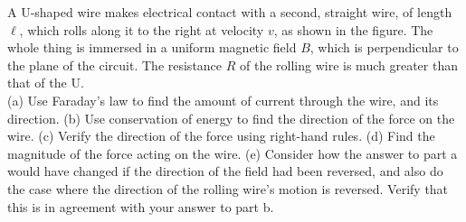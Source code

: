 A U-shaped wire makes electrical contact with a second, straight wire, of length $\ell$, which rolls along it to the
right at velocity $v$,
as shown in the figure. The whole thing is immersed in a uniform magnetic field $B$, which is
perpendicular to the plane of the circuit. The resistance $R$ of the rolling wire is much
greater than that of the U.\\
(a) Use Faraday's law to find the amount of current through the wire, and its direction.\answercheck\hwendpart
(b) Use conservation of energy to find the direction of the force on the wire.\hwendpart
(c) Verify the direction of the force using right-hand rules.\hwendpart
(d) Find the magnitude of the force acting on the wire.\answercheck\hwendpart
(e) Consider how the answer to part a would have changed if the direction of the field had been
reversed, and also do the case where the direction of the rolling wire's motion is reversed.
Verify that this is in agreement with your answer to part b.
